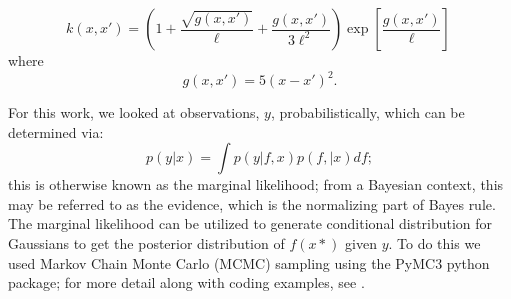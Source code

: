 \documentclass[peerreview]{ieeesyscoin}
\begin{document}
\begin{equation}
k(x,x') = \left( 1 + \dfrac{\sqrt{g(x,x')}}{\ell} + \dfrac{g(x,x')}{3\ell^2}\right)\exp\left[ \dfrac{g(x,x')}{\ell} \right]\ 
\end{equation}
where
\begin{equation}
	g(x,x') = 5(x-x')^2.
\end{equation}

For this work, we looked at observations, $y$, probabilistically, which can be determined via:
\begin{equation}
p(y|x) = \int p(y | f,x) p (f, |x) df;
\end{equation}
this is otherwise known as the marginal likelihood; from a Bayesian context, this may be referred to as the evidence, which is the normalizing part of Bayes rule. The marginal likelihood can be utilized to generate conditional distribution for Gaussians to get the posterior distribution of $f(x*)$ given $y$. To do this we used Markov Chain Monte Carlo (MCMC) sampling using the PyMC3 python package; for more detail along with coding examples, see \cite{Fon20}.
\end{document}
